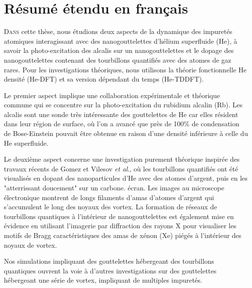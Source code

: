 \chapter{Résumé étendu en français} %
	\lettrine[lines=4]{\color{activeColor}D}{ans} cette thèse, nous étudions deux aspects de la dynamique des impuretés atomiques interagissant avec des nanogouttelettes d'hélium superfluide (He), à savoir la photo-excitation des alcalis sur un nanogouttelettes et le dopage des nanogouttelettes contenant des tourbillons quantifiés avec des atomes de gaz rares. Pour les investigations théoriques, nous utilisons la théorie fonctionnelle He densité (He-DFT) et sa version dépendant du temps (He-TDDFT).

	Le premier aspect implique une collaboration expérimentale et théorique commune qui se concentre sur la photo-excitation du rubidium alcalin (Rb). Les alcalis sont une sonde très intéressante des gouttelettes de He car elles résident dans leur région de surface, où l'on a avancé que près de 100\% de condensation de Bose-Einstein pouvait être obtenue en raison d'une densité inférieure à celle du He superfluide.
	
	Le deuxième aspect concerne une investigation purement théorique inspirée des travaux récents de Gomez et Vilesov \emph{et al}., où les tourbillons quantifiés ont été visualisés en dopant des nanoparticules d'He avec des atomes d'argent, puis en les "atterrissant doucement" sur un carbone. écran. Les images au microscope électronique montrent de longs filaments d'amas d'atomes d'argent qui s'accumulent le long des noyaux des vortex. La formation de réseaux de tourbillons quantiques à l'intérieur de nanogouttelettes est également mise en évidence en utilisant l'imagerie par diffraction des rayons X pour visualiser les motifs de Bragg caractéristiques des amas de xénon (Xe) piégés à l'intérieur des noyaux de vortex.
	
	Nos simulations impliquant des gouttelettes hébergeant des tourbillons quantiques ouvrent la voie à d'autres investigations sur des gouttelettes hébergeant une série de vortex, impliquant de multiples impuretés.
		
